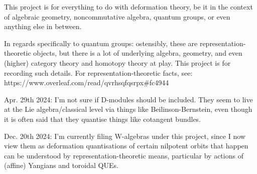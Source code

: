 This project is for everything to do with deformation theory, be it in the context of algebraic geometry, noncommutative algebra, quantum groups, or even anything else in between.

In regards specifically to quantum groups: ostensibly, these are representation-theoretic objects, but there is a lot of underlying algebra, geometry, and even (higher) category theory and homotopy theory at play. This project is for recording such details. For representation-theoretic facts, see:
    https://www.overleaf.com/read/qvrhsqfqsrpx#fc4944

Apr. 29th 2024: I'm not sure if D-modules should be included. They seem to live at the Lie algebra/classical level via things like Beilinson-Bernstein, even though it is often said that they quantise things like cotangent bundles. 

Dec. 20th 2024: I'm currently filing W-algebras under this project, since I now view them as deformation quantisations of certain nilpotent orbits that happen can be understood by representation-theoretic means, particular by actions of (affine) Yangians and toroidal QUEs.